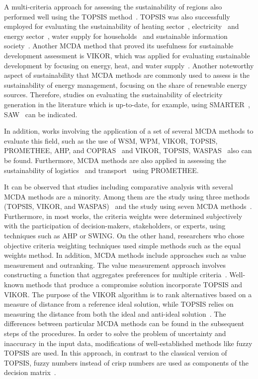 \documentclass[5p,times]{elsarticle}
\newcounter{example}[section]
\begin{document}
A multi-criteria approach for assessing the sustainability of regions also performed well using the TOPSIS method~\cite{boggia2018spatial}. TOPSIS was also successfully employed for evaluating the sustainability of heating sector~\cite{siksnelyte2021multi}, electricity~\cite{sahabuddin2021multi} and energy sector~\cite{su2020sustainability}, water supply for households~\cite{boggia2018spatial} and sustainable information society~\cite{wkatrobski2018index}. Another MCDA method that proved its usefulness for sustainable development assessment is VIKOR, which was applied for evaluating sustainable development by focusing on energy, heat, and water supply~\cite{aberilla2020integrated}. Another noteworthy aspect of sustainability that MCDA methods are commonly used to assess is the sustainability of energy management, focusing on the share of renewable energy sources. Therefore, studies on evaluating the sustainability of electricity generation in the literature which is up-to-date, for example, using SMARTER~\cite{khan2019power, khan2020sustainability}, SAW~\cite{naegler2021integrated, shaaban2018sustainability} can be indicated.

In addition, works involving the application of a set of several MCDA methods to evaluate this field, such as the use of WSM, WPM, VIKOR, TOPSIS, PROMETHEE, AHP, and COPRAS~\cite{sahabuddin2021multi} and VIKOR, TOPSIS, WASPAS~\cite{su2020sustainability} also can be found. Furthermore, MCDA methods are also applied in assessing the sustainability of logistics~\cite{melkonyan2020sustainability} and transport~\cite{morfoulaki2021use} using PROMETHEE.

It can be observed that studies including comparative analysis with several MCDA methods are a minority. Among them are the study using three methods (TOPSIS, VIKOR, and WASPAS)~\cite{su2020sustainability} and the study using seven MCDA methods~\cite{sahabuddin2021multi}. Furthermore, in most works, the criteria weights were determined subjectively with the participation of decision-makers, stakeholders, or experts, using techniques such as AHP or SWING. On the other hand, researchers who chose objective criteria weighting techniques used simple methods such as the equal weights method. In addition, MCDA methods include approaches such as value measurement and outranking. The value measurement approach involves constructing a function that aggregates preferences for multiple criteria~\cite{pesce2018selecting}. Well-known methods that produce a compromise solution incorporate TOPSIS and VIKOR. The purpose of the VIKOR algorithm is to rank alternatives based on a measure of distance from a reference ideal solution, while TOPSIS relies on measuring the distance from both the ideal and anti-ideal solution~\cite{colapinto2020environmental}. The differences between particular MCDA methods can be found in the subsequent steps of the procedures. In order to solve the problem of uncertainty and inaccuracy in the input data, modifications of well-established methods like fuzzy TOPSIS are used. In this approach, in contrast to the classical version of TOPSIS, fuzzy numbers instead of crisp numbers are used as components of the decision matrix~\cite{lombardi2021multiple}.
\end{document}
